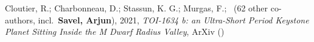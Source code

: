 \item[{\color{numcolor}\scriptsize1}] Cloutier, R.; Charbonneau, D.; Stassun, K. G.; Murgas, F.; \etal\ ({62} other co-authors, incl.\ \textbf{Savel, Arjun}), 2021, \emph{TOI-1634 b: an Ultra-Short Period Keystone Planet Sitting Inside the M Dwarf Radius Valley}, ArXiv ()